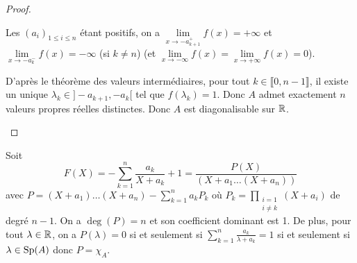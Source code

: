 \documentclass[12pt]{article}
\begin{document}
\begin{proof}
\begin{enumerate}
		Les $(a_{i})_{1\leqslant i\leqslant n}$ étant positifs, on a $\lim\limits_{x\to-a_{k+1}^{+}}f(x)=+\infty$ et $\lim\limits_{x\to-a_{k}^{-}}f(x)=-\infty$ (si $k\neq n$) (et $\lim\limits_{x\to-\infty}f(x)=\lim\limits_{x\to+\infty}f(x)=0$).

		D'après le théorème des valeurs intermédiaires, pour tout $k\in\llbracket0,n-1\rrbracket$, il existe un unique $\lambda_{k}\in]-a_{k+1},-a_{k}[$ tel que $f(\lambda_{k})=1$. Donc $A$ admet exactement $n$ valeurs propres réelles distinctes. Donc $A$ est diagonalisable sur $\mathbb{R}$.
	\end{enumerate}
\end{proof}

\begin{remark}
	Soit 
	\begin{equation}
		F(X)=-\sum_{k=1}^{n}\frac{a_{k}}{X+a_{k}}+1=\frac{P(X)}{(X+a_{1}\dots(X+a_{n}))}
	\end{equation}
	avec $P=(X+a_{1})\dots(X+a_{n})-\sum_{k=1}^{n}a_{k}P_{k}$ où $P_{k}=\prod_{\substack{i=1\\i\neq k}}(X+a_{i})$ de degré $n-1$. On a $\deg(P)=n$ et son coefficient dominant est 1. De plus, pour tout $\lambda\in\mathbb{R}$, on a $P(\lambda)=0$ si et seulement si $\sum_{k=1}^{n}\frac{a_{k}}{\lambda+a_{k}}=1$ si et seulement si $\lambda\in\operatorname{Sp}(A)$ donc $P=\chi_{A}$.
\end{remark}
\end{document}
